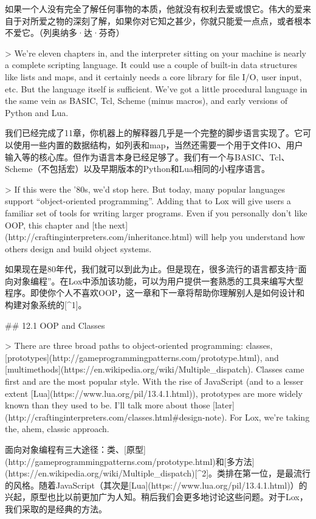 \documentclass[cn,11pt,chinese]{elegantbook}
\begin{document}
{{{{{{{{{{{{{{{{{{如果一个人没有完全了解任何事物的本质，他就没有权利去爱或恨它。伟大的爱来自于对所爱之物的深刻了解，如果你对它知之甚少，你就只能爱一点点，或者根本不爱它。（列奥纳多·达·芬奇）

> We’re eleven chapters in, and the interpreter sitting on your machine is nearly a complete scripting language. It could use a couple of built-in data structures like lists and maps, and it certainly needs a core library for file I/O, user input, etc. But the language itself is sufficient. We’ve got a little procedural language in the same vein as BASIC, Tcl, Scheme (minus macros), and early versions of Python and Lua.

我们已经完成了11章，你机器上的解释器几乎是一个完整的脚步语言实现了。它可以使用一些内置的数据结构，如列表和map，当然还需要一个用于文件IO、用户输入等的核心库。但作为语言本身已经足够了。我们有一个与BASIC、Tcl、Scheme（不包括宏）以及早期版本的Python和Lua相同的小程序语言。

> If this were the ’80s, we’d stop here. But today, many popular languages support “object-oriented programming”. Adding that to Lox will give users a familiar set of tools for writing larger programs. Even if you personally don’t like OOP, this chapter and [the next](http://craftinginterpreters.com/inheritance.html) will help you understand how others design and build object systems.

如果现在是80年代，我们就可以到此为止。但是现在，很多流行的语言都支持“面向对象编程”。在Lox中添加该功能，可以为用户提供一套熟悉的工具来编写大型程序。即使你个人不喜欢OOP，这一章和下一章将帮助你理解别人是如何设计和构建对象系统的[^1]。

## 12.1 OOP and Classes

> There are three broad paths to object-oriented programming: classes, [prototypes](http://gameprogrammingpatterns.com/prototype.html), and [multimethods](https://en.wikipedia.org/wiki/Multiple_dispatch). Classes came first and are the most popular style. With the rise of JavaScript (and to a lesser extent [Lua](https://www.lua.org/pil/13.4.1.html)), prototypes are more widely known than they used to be. I’ll talk more about those [later](http://craftinginterpreters.com/classes.html#design-note). For Lox, we’re taking the, ahem, classic approach.

面向对象编程有三大途径：类、[原型](http://gameprogrammingpatterns.com/prototype.html)和[多方法](https://en.wikipedia.org/wiki/Multiple_dispatch)[^2]。类排在第一位，是最流行的风格。随着JavaScript（其次是[Lua](https://www.lua.org/pil/13.4.1.html)）的兴起，原型也比以前更加广为人知。稍后我们会更多地讨论这些问题。对于Lox，我们采取的是经典的方法。

}}}}}}}}}}}}}}}}}}
\end{document}
